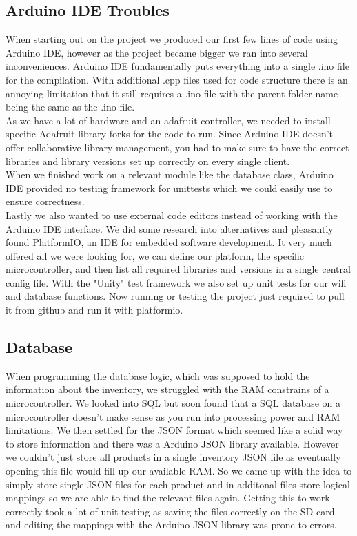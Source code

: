 \documentclass{article}
\begin{document}
\subsection{Arduino IDE Troubles}
When starting out on the project we produced our first few lines of code using Arduino IDE, however as the project became bigger we ran into several inconveniences.
Arduino IDE fundamentally puts everything into a single .ino file for the compilation. With additional .cpp files used for code structure there is an annoying limitation that it still requires a .ino file with the parent folder name being the same as the .ino file. \\
As we have a lot of hardware and an adafruit controller, we needed to install specific Adafruit library forks for the code to run. 
Since Arduino IDE doesn't offer collaborative library management, you had to make sure to have the correct libraries and library versions set up correctly on every single client. \\
When we finished work on a relevant module like the database class, Arduino IDE provided no testing framework for unittests which we could easily use to ensure correctness. \\
Lastly we also wanted to use external code editors instead of working with the Arduino IDE interface.
We did some research into alternatives and pleasantly found PlatformIO, an IDE for embedded software development.
It very much offered all we were looking for, we can define our platform, the specific microcontroller, and then list all required libraries and versions in a single central config file.
With the "Unity" test framework we also set up unit tests for our wifi and database functions.
Now running or testing the project just required to pull it from github and run it with platformio.
\subsection{Database}
When programming the database logic, which was supposed to hold the information about the inventory, we struggled with the RAM constrains of a microcontroller.
We looked into SQL but soon found that a SQL database on a microcontroller doesn't make sense as you run into processing power and RAM limitations.
We then settled for the JSON format which seemed like a solid way to store information and there was a Arduino JSON library available.
However we couldn't just store all products in a single inventory JSON file as eventually opening this file would fill up our available RAM.
So we came up with the idea to simply store single JSON files for each product and in additonal files store logical mappings so we are able to find the relevant files again.
Getting this to work correctly took a lot of unit testing as saving the files correctly on the SD card and editing the mappings with the Arduino JSON library was prone to errors.
\end{document}
